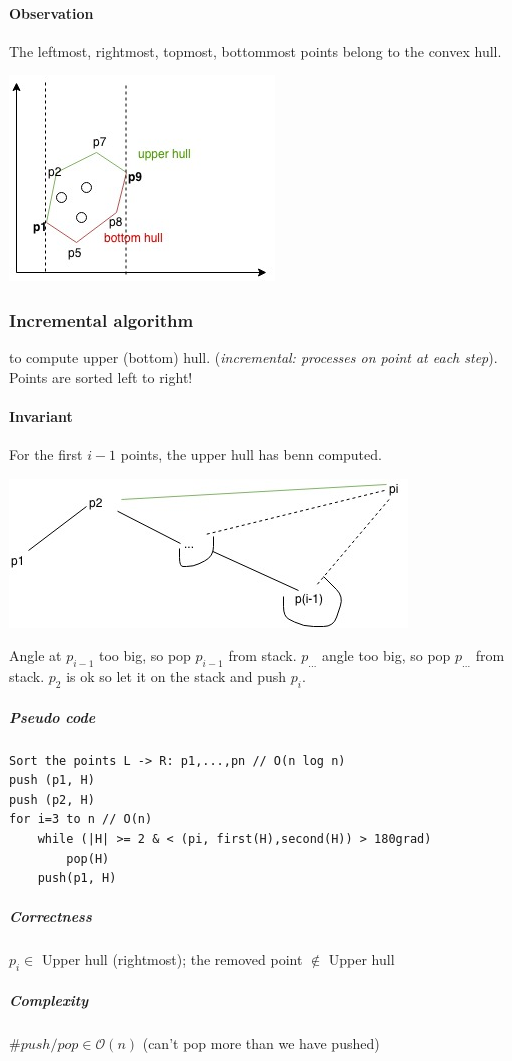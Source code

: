 \paragraph{Observation} The leftmost, rightmost, topmost, bottommost points belong to the convex hull. \\
\begin{center}
\includegraphics[scale=0.5]{img/convex2} 
\end{center}
\subsubsection{Incremental algorithm} to compute upper (bottom) hull. (\textit{incremental: processes on point at each step}). Points are sorted left to right!
\paragraph{Invariant} For the first $i-1$ points, the upper hull has benn computed. \\
\begin{center}
	\includegraphics[scale=0.5]{img/convex3} 
\end{center}
Angle at $p_{i-1}$ too big, so pop $p_{i-1}$ from stack. $p_{...}$ angle too big, so pop $p_{...}$ from stack. $p_2$ is ok so let it on the stack and push $p_i$.
\subparagraph{Pseudo code}
\begin{verbatim}
Sort the points L -> R: p1,...,pn // O(n log n)
push (p1, H)
push (p2, H)
for i=3 to n // O(n)
    while (|H| >= 2 & < (pi, first(H),second(H)) > 180grad)
        pop(H)
    push(p1, H)
\end{verbatim}
\subparagraph{Correctness} $p_i \in $ Upper hull (rightmost); the removed point $\notin$ Upper hull
\subparagraph{Complexity} $\#push/pop \in \mathcal{O}(n)$ (can't pop more than we have pushed)
